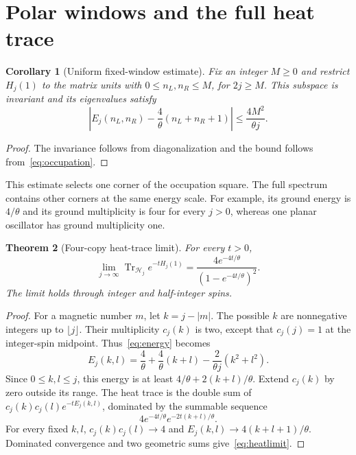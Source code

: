 \documentclass[11pt,a4paper]{article}
\newtheorem{theorem}{Theorem}[section]
\newtheorem{corollary}[theorem]{Corollary}
\theoremstyle{remark}\newtheorem{remark}[theorem]{Remark}
\newcommand{\Tr}{\operatorname{Tr}}
\newcommand{\Hj}{\mathcal H_j}
\begin{document}
\section{Polar windows and the full heat trace}
\begin{corollary}[Uniform fixed-window estimate]\label{cor:window}
Fix an integer $M\ge0$ and restrict $H_j(1)$ to the matrix units with $0\le n_L,n_R\le M$, for $2j\ge M$.
This subspace is invariant and its eigenvalues satisfy
\begin{equation}
 \left|E_j(n_L,n_R)-\frac4\theta(n_L+n_R+1)\right|
 \le\frac{4M^2}{\theta j}.
\end{equation}
\end{corollary}
\begin{proof}
The invariance follows from diagonalization and the bound follows from~\eqref{eq:occupation}.
\end{proof}

This estimate selects one corner of the occupation square.
The full spectrum contains other corners at the same energy scale.
For example, its ground energy is $4/\theta$ and its ground multiplicity is four for every $j>0$, whereas one planar oscillator has ground multiplicity one.

\begin{theorem}[Four-copy heat-trace limit]\label{thm:heat}
For every $t>0$,
\begin{equation}\label{eq:heatlimit}
 \lim_{j\to\infty}\Tr_{\Hj}e^{-tH_j(1)}
 =\frac{4e^{-4t/\theta}}{(1-e^{-4t/\theta})^2}.
\end{equation}
The limit holds through integer and half-integer spins.
\end{theorem}
\begin{proof}
For a magnetic number $m$, let $k=j-|m|$.
The possible $k$ are nonnegative integers up to $\lfloor j\rfloor$.
Their multiplicity $c_j(k)$ is two, except that $c_j(j)=1$ at the integer-spin midpoint.
Thus~\eqref{eq:energy} becomes
\begin{equation}
 E_j(k,l)=\frac4\theta+\frac4\theta(k+l)
 -\frac2{\theta j}(k^2+l^2).
\end{equation}
Since $0\le k,l\le j$, this energy is at least $4/\theta+2(k+l)/\theta$.
Extend $c_j(k)$ by zero outside its range.
The heat trace is the double sum of $c_j(k)c_j(l)e^{-tE_j(k,l)}$, dominated by the summable sequence
\begin{equation}
 4e^{-4t/\theta}e^{-2t(k+l)/\theta}.
\end{equation}
For every fixed $k,l$, $c_j(k)c_j(l)\to4$ and $E_j(k,l)\to4(k+l+1)/\theta$.
Dominated convergence and two geometric sums give~\eqref{eq:heatlimit}.
\end{proof}
\end{document}
